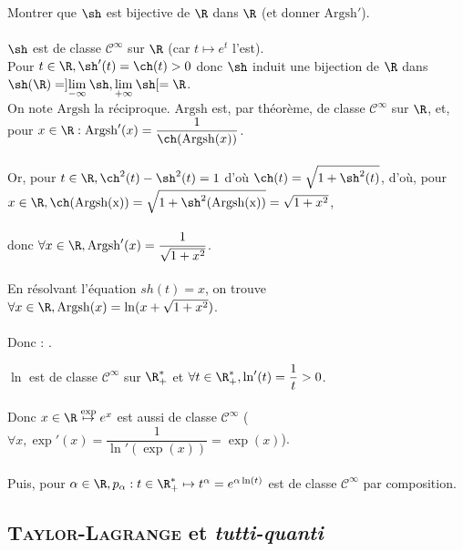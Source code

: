 \documentclass[12pt,a4paper]{report}
\begin{document}
\begin{application}{}{}
Montrer que $\sh$ est bijective de $\R$ dans $\R$ (et donner $\mathrm{Argsh}'$). \\ \\
$\sh$ est de classe $\mathcal{C}^{\infty}$ sur $\R$ (car $t \mapsto e^t$ l'est). \\
Pour $t \in \R, \sh'(t) = \ch(t) >0$ donc $\sh$ induit une bijection de $\R$ dans $\sh(\R) = ]\underset{-\infty}{\lim} \: \sh, \underset{+\infty}{\lim} \: \sh[ = \R$. \\
On note $\mathrm{Argsh}$ la réciproque. $\mathrm{Argsh}$ est, par théorème, de classe $\mathcal{C}^{\infty}$ sur $\R$, et, pour $x \in \R : \\ \\
\mathrm{Argsh}'(x) = \dfrac{1}{\ch(\mathrm{Argsh}(x))}$. \\ \\
Or, pour $t \in \R, \ch^2(t) - \sh^2(t) = 1$ d'où $\ch(t) = \sqrt{1+\sh^2(t)}$, d'où, pour $x \in \R, \ch(\mathrm{Argsh(x)}) = \sqrt{1+\sh^2(\mathrm{Argsh(x))}} = \sqrt{1+x^2}$, \\ \\
donc $\forall x \in \R, \mathrm{Argsh}'(x) = \dfrac{1}{\sqrt{1+x^2}}$. \\ \\
En résolvant l'équation $sh(t) = x$, on trouve $\forall x \in \R, \mathrm{Argsh}(x) = \ln(x+\sqrt{1+x^2})$. \\ \\
Donc  : .
\end{application}

\begin{remarque}
$\ln$ est de classe $\mathcal{C}^{\infty}$ sur $\R_+^*$ et $\forall t \in \R_+^*, \ln'(t) = \dfrac{1}{t} > 0$. \\ \\
Donc $x \in \R \overset{\exp}{\mapsto} e^x$ est aussi de classe $\mathcal{C}^{\infty}$ ($\forall x, \exp'(x) = \dfrac{1}{\ln'(\exp(x))} = \exp(x)$). \\ \\
Puis, pour $\alpha \in \R, p_{\alpha} : t \in \R_+^* \mapsto t^{\alpha} = e^{\alpha \ln(t)}$ est de classe $\mathcal{C}^{\infty}$ par composition.

\end{remarque}

\subsection{\textsc{Taylor-Lagrange} et \textit{tutti-quanti}}
\end{document}
